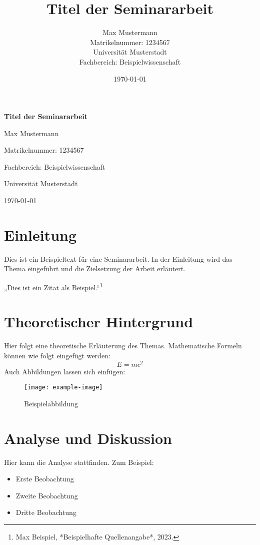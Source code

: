 \documentclass[12pt,a4paper]{article}
\title{Titel der Seminararbeit}
\author{Max Mustermann \\
Matrikelnummer: 1234567 \\
Universität Musterstadt \\
Fachbereich: Beispielwissenschaft}
\date{\today}
\begin{document}
\begin{titlepage}
    \centering
    \vspace*{3cm}
    {\LARGE\bfseries Titel der Seminararbeit \par}
    \vspace{2cm}
    {\large Max Mustermann \par}
    \vspace{0.5cm}
    Matrikelnummer: 1234567 \par
    Fachbereich: Beispielwissenschaft \par
    Universität Musterstadt \par
    \vfill
    \today
\end{titlepage}

\tableofcontents
\newpage

\section{Einleitung}
Dies ist ein Beispieltext für eine Seminararbeit. In der Einleitung wird das Thema eingeführt und die Zielsetzung der Arbeit erläutert. \par
„Dies ist ein Zitat als Beispiel.“\footnote{Max Beispiel, *Beispielhafte Quellenangabe*, 2023.}

\section{Theoretischer Hintergrund}
Hier folgt eine theoretische Erläuterung des Themas. Mathematische Formeln können wie folgt eingefügt werden:
\[
    E = mc^2
\]
Auch Abbildungen lassen sich einfügen:

\begin{figure}[h!]
    \centering
    \texttt{[image: example-image]}
    \caption{Beispielabbildung}
\end{figure}

\section{Analyse und Diskussion}
Hier kann die Analyse stattfinden. Zum Beispiel:
\begin{itemize}
    \item Erste Beobachtung
    \item Zweite Beobachtung
    \item Dritte Beobachtung
\end{itemize}
\end{document}
